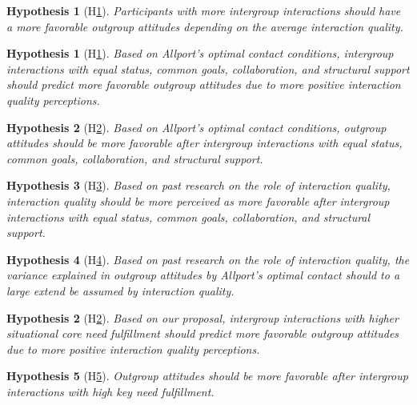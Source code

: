 \documentclass[man, 12pt, a4paper]{apa7}
\theoremstyle{break}
\theoremstyle{plain}
\newtheorem{hyp}{Hypothesis}
\newtheorem{subhyp}{Hypothesis}
\begin{document}
\begin{subhyp}[H\ref{hyp:contactFreqQual}] \label{hyp:contactFreqQual}
\addtolength{\leftskip}{2.5em}
Participants with more intergroup interactions should have a more favorable outgroup attitudes depending on the average interaction quality.
\end{subhyp}

\begin{hyp}[H\ref{hyp:AllportsConditions}] \label{hyp:AllportsConditions}
Based on Allport's optimal contact conditions, intergroup interactions with equal status, common goals, collaboration, and structural support should predict more favorable outgroup attitudes due to more positive interaction quality perceptions.
\end{hyp}

\setcounter{subhyp}{0}
\begin{subhyp}[H\ref{hyp:AllportsPred}] \label{hyp:AllportsPred}
\addtolength{\leftskip}{2.5em}
Based on Allport's optimal contact conditions, outgroup attitudes should be more favorable after intergroup interactions with equal status, common goals, collaboration, and structural support.
\end{subhyp}

\begin{subhyp}[H\ref{hyp:AllportsQuality}] \label{hyp:AllportsQuality}
\addtolength{\leftskip}{2.5em}
Based on past research on the role of interaction quality, interaction quality should be more perceived as more favorable after intergroup interactions with equal status, common goals, collaboration, and structural support.
\end{subhyp}

\begin{subhyp}[H\ref{hyp:AllportsQualityMediation}] \label{hyp:AllportsQualityMediation}
\addtolength{\leftskip}{2.5em}
Based on past research on the role of interaction quality, the variance explained in outgroup attitudes by Allport's optimal contact should to a large extend be assumed by interaction quality.
\end{subhyp}

\begin{hyp}[H\ref{hyp:keyNeed}] \label{hyp:keyNeed}
Based on our proposal, intergroup interactions with higher situational core need fulfillment should predict more favorable outgroup attitudes due to more positive interaction quality perceptions.
\end{hyp}

\setcounter{subhyp}{0}
\begin{subhyp}[H\ref{hyp:keyNeedPred}] \label{hyp:keyNeedPred}
\addtolength{\leftskip}{2.5em}
Outgroup attitudes should be more favorable after intergroup interactions with high key need fulfillment.
\end{subhyp}
\end{document}
